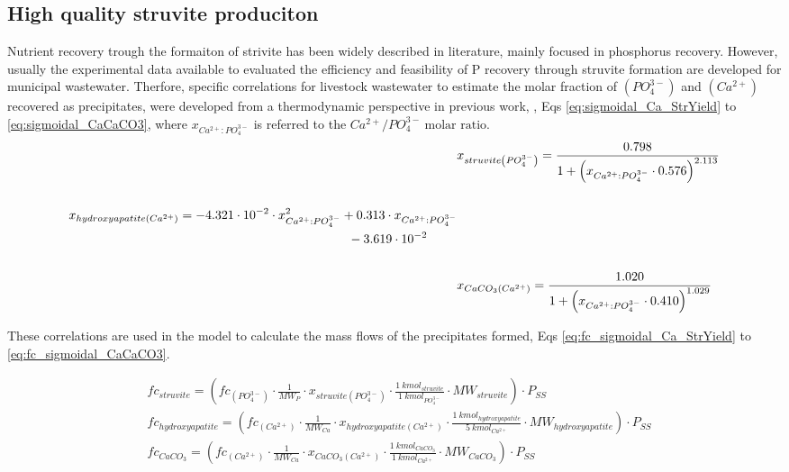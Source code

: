 \documentclass[10pt,a4paper]{article}
\begin{document}
\subsection{High quality struvite produciton}
Nutrient recovery trough the formaiton of strivite has been widely described in literature, mainly focused in phosphorus recovery. However, usually the experimental data available to evaluated the efficiency and feasibility of P recovery through struvite formation are developed for municipal wastewater. Therfore, specific correlations for livestock wastewater to estimate the molar fraction of $\left(PO_{4}^{3-}\right)$ and $\left(Ca^{2+}\right)$ recovered as precipitates, were developed from a thermodynamic perspective in previous work, \cite{MartinStruvite}, Eqs \ref{eq:sigmoidal_Ca_StrYield} to \ref{eq:sigmoidal_CaCaCO3}, where $ x_{Ca^{2+}:PO_{4}^{3-}}$ is referred to the $Ca^{2+}/PO_{4}^{3-} \ \text{molar ratio}$.
\begin{align}
&x_{struvite \left(PO_{4}^{3-}\right) }= \frac{0.798}{1+\left(x_{Ca^{2+}:PO_{4}^{3-}} \cdot 0.576\right)^{2.113}} \label{eq:sigmoidal_Ca_StrYield} \\
\nonumber \\
\begin{split}
& x_{hydroxyapatite \left(Ca^{2+}\right)} = -4.321 \cdot 10^{-2} \cdot x_{Ca^{2+}:PO_{4}^{3-}}^{2} + 0.313 \cdot x_{Ca^{2+}:PO_{4}^{3-}} \\& \hspace{7.8cm} - 3.619 \cdot 10^{-2} \label{eq:sigmoidal_Ca_HAP}
\end{split}
\\
\nonumber \\
&  x_{CaCO_{3} \left(Ca^{2+}\right)} = \frac{1.020}{1+\left(x_{Ca^{2+}:PO_{4}^{3-}} \cdot 0.410 \right)^{1.029}} \label{eq:sigmoidal_CaCaCO3}
\end{align}

These correlations are used in the model to calculate the mass flows of the precipitates formed, Eqs \ref{eq:fc_sigmoidal_Ca_StrYield} to \ref{eq:fc_sigmoidal_CaCaCO3}.

\begin{align}
&fc_{struvite} = \left(fc_{\left(PO_{4}^{3-}\right)} \cdot \frac{1}{MW_{P}} \cdot x_{struvite \left(PO_{4}^{3-}\right) } \cdot \frac{1 \ kmol_{struvite}}{1 \ kmol_{PO_{4}^{3-}}} \cdot MW_{struvite}\right) \cdot P_{SS} \label{eq:fc_sigmoidal_Ca_StrYield} \\
&fc_{hydroxyapatite} = \left(fc_{\left(Ca^{2+}\right)} \cdot \frac{1}{MW_{Ca}} \cdot x_{hydroxyapatite \left(Ca^{2+}\right)}  \cdot \frac{1 \ kmol_{hydroxyapatite}}{5 \ kmol_{Ca^{2+}}} \cdot MW_{hydroxyapatite} \right) \cdot P_{SS} \label{eq:fc_sigmoidal_Ca_HAP} \\
&fc_{CaCO_{3}} = \left(fc_{\left(Ca^{2+}\right)} \cdot \frac{1}{MW_{Ca}} \cdot x_{CaCO_{3} \left(Ca^{2+}\right)}  \cdot \frac{1 \ kmol_{CaCO_{3}}}{1 \ kmol_{Ca^{2+}}} \cdot MW_{CaCO_{3}} \right) \cdot P_{SS} \label{eq:fc_sigmoidal_CaCaCO3}
\end{align}
\end{document}
